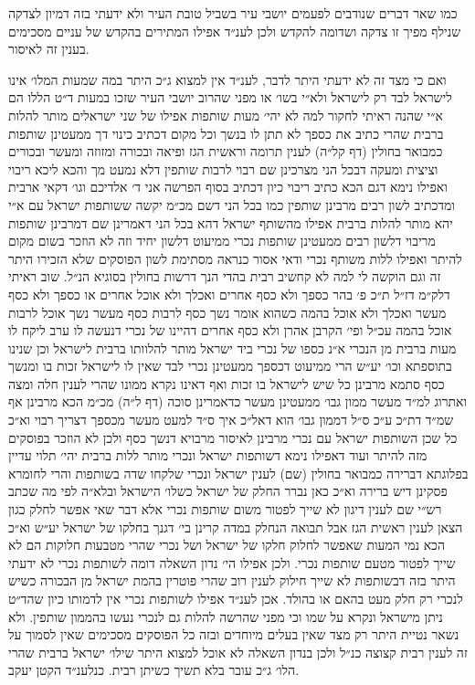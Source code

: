 \documentclass[12pt, openany]{book}
\begin{document}
\begin{multicols}{2}
כמו שאר דברים שנודבים לפעמים יושבי עיר בשביל טובת העיר ולא ידעתי בזה דמיון לצדקה שנילף מפיך זו צדקה ושדומה להקדש ולכן לענ״ד אפילו המתירים בהקדש של עניים מסכימים בענין זה לאיסור.\\\vspace{0pt}

ואם כי מצד זה לא ידעתי היתר לדבר, לענ״ד אין למצוא ג״כ היתר במה שמעות המלו׳ אינו לישראל לבד רק לישראל ולא״י בשו׳ או מפני שהרוב יושבי העיר שזכו במעות ד״ט הללו הם א״י שהנה ראיתי לחקור למה לא יהי׳ מעות שותפות אפילו של שני ישראלים מותר להלות ברבית שהרי כתיב את כספך לא תתן לו בנשך וכל מקום דכתיב כינוי דך ממעטינן שותפות כמבואר בחולין (דף קל״ה) לענין תרומה וראשית הגז ופיאה ובכורה ומזוזה ומעשר ובכורים וציצית ומעקה דבכל הני מצרכינן שם רבוי לרבות שותפין דלא נמעט מך והכא ליכא ריבוי ואפילו נימא דגם הכא כתיב ריבוי כיון דכתיב בסוף הפרשה אני ד׳ אלדיכם וגו׳ דקאי ארבית ומדכתיב לשון רבים מרבינן שותפין כמו בכל הני דשם מכ״מ יקשה ששותפות ישראל עם א״י יהא מותר להלות ברבית אפילו מהשותף ישראל דהא בכל הני דאמרינן שם דמרבינן שותפות מריבוי דלשון רבים ממעטינן שותפות נכרי ממיעוט דלשון יחיד וזה לא הוזכר בשום מקום להיתר ואפילו ללות משותף נכרי ודאי אסור כנראה מסתימת לשון הפוסקים שלא הזכירו היתר זה וגם הוקשה לי למה לא קחשיב רבית בהדי הנך דרשות בחולין בסוגיא הנ״ל. שוב ראיתי דלק״מ דז״ל ת״כ פ׳ בהר כספך ולא כסף אחרים ואכלך ולא אוכל אחרים או כספך ולא כסף מעשר ואכלך ולא אוכל בהמה כשהוא אומר נשך כסף לרבות כסף מעשר נשך אוכל לרבות אוכל בהמה עכ״ל ופי׳ הקרבן אהרן ולא כסף אחרים דהיינו של נכרי דנעשה לו ערב ליקח לו מעות ברבית מן הנכרי א״נ כספו של נכרי ביד ישראל מותר להלוותו ברבית לישראל וכן שנינו בתוספתא וכו׳ יע״ש הרי ממיעוט דכספך ממעטינן נכרי לבד שאין לו לישראל זכות בו ומנשך כסף סתמא מרבינן כל שיש לישראל בו זכות ואף דאינו נקרא ממונו שהרי לענין חלה ומצה ואתרוג למ״ד מעשר ממון גבו׳ ממעטינן מעשר כדאמרינן סוכה (דף ל״ה) מכ״מ הכא מרבינן אף שמ״ד דת״כ ע״כ ס״ל דממון גבו׳ הוא דאל״כ איך ס״ד למעט מעשר מכספך דצריך רבוי וא״כ כל שכן השותפות ישראל עם נכרי מרבינן לאיסור מרבויא דנשך כסף ולכן לא הוזכר בפוסקים מזה להיתר ועוד דאפילו נימא דשותפות ישראל ונכרי מותר ללות ברבית יהי׳ תלוי עדיין בפלוגתא דברירה כמבואר בחולין (שם) לענין ישראל ונכרי שלקחו שדה בשותפות והרי לחומרא פסקינן דיש ברירה וא״כ כאן נברר החלק של ישראל כשלו׳ הישראל ובלא״ה לפי מה שכתב רש״י שם לענין דיגון לא שייך לפטור משום שותפות נכרי אלא דבר שאי אפשר לחלק כגון הצאן לענין ראשית הגז אבל תבואה הנחלק במדה קרינן בי׳ דגנך בחלקו של ישראל יע״ש וא״כ הכא נמי המעות שאפשר לחלוק חלקו של ישראל ושל נכרי שהרי מטבעות חלוקות הם לא שייך לפטור מטעם שותפות נכרי. ולכן אפילו הי׳ נדון השאלה דומה לשותפות נכרי לא ידעתי היתר בזה דבשותפות לא שייך חילוק לענין רוב שהרי פוטרין בהמת ישראל מן הבכורה כשיש לנכרי רק חלק מעט בהאם או בהולד. אכן לענ״ד אפילו לשותפות נכרי אין לדמותו כיון שהד״ט ניתן מישראל ונקרא על שמו וכי מפני שהרשה להלות גם לנכרי נעשו בהממון שותפין. ולא נשאר נטיית היתר רק מצד שאין בעלים מיוחדים ובזה כל הפוסקים מסכימים שאין לסמוך על זה לענין רבית קצוצה כנ״ל ולכן בנדון השאלה לא אוכל למצוא היתר שילו׳ ישראל ברבית שהרי הלו׳ ג״כ עובר בלא תשיך כשיתן רבית. כנלענ״ד הקטן יעקב.\\\vspace{0pt}

\end{multicols}\newpage
\end{document}
